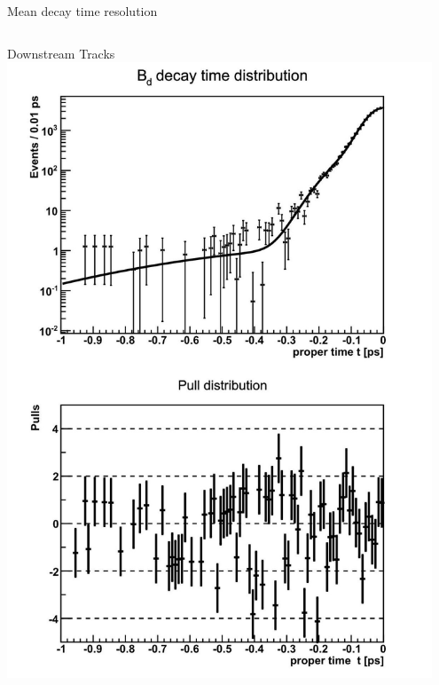 \documentclass{beamer}
\begin{document}
\begin{frame}{Mean decay time resolution}
\begin{columns}
\begin{block}{Downstream Tracks}
	\includegraphics[width=0.95\textwidth]{resolution_ds}
	\end{block}
	\end{columns}
	\end{frame}
\end{document}
